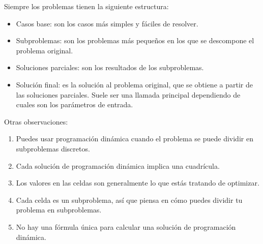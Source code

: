 Siempre los problemas tienen la siguiente estructura:
\begin{itemize}
    \item Casos base: son los casos más simples y fáciles de resolver.
    \item Subproblemas: son los problemas más pequeños en los que se descompone el problema original.
    \item Soluciones parciales: son los resultados de los subproblemas.
    \item Solución final: es la solución al problema original, que se obtiene a partir de las soluciones parciales. Suele ser una llamada principal dependiendo de cuales son los parámetros de entrada.
\end{itemize}
Otras observaciones:
\begin{enumerate}
    \item Puedes usar programación dinámica cuando el problema se puede dividir en subproblemas discretos.
    \item Cada solución de programación dinámica implica una cuadrícula.
    \item Los valores en las celdas son generalmente lo que estás tratando de optimizar.
    \item Cada celda es un subproblema, así que piensa en cómo puedes dividir tu problema en subproblemas.
    \item No hay una fórmula única para calcular una solución de programación dinámica.
\end{enumerate}
